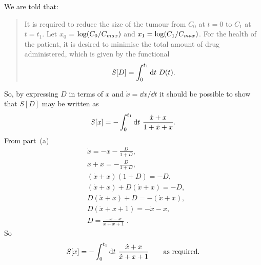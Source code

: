 We are told that:
\begin{quote}
	It is required to reduce the size of the tumour from $C_0$ at $t = 0$ to $C_1$ at
	$t = t_1$. Let $x_0$ = $\log(C_0/C_{max})$ and $x_1 = \log(C_1/C_{max})$. For the health of the
	patient, it is desired to minimise the total amount of drug administered,
	which is given by the functional
	\[
		S[D] = \int_{0}^{t_1}\mathrm{d} t\,\,D(t).
	\]
\end{quote}
So, by expressing $D$ in terms of $x$ and $\dot{x}=\dd x/\dd t$ it should be possible to show that $S[D]$ may be written as
\[
	S[x] = -\int_{0}^{t_1}\mathrm{d} t\,\,\frac{\dot{x} + x}{1 + \dot{x} + x}.
\]
From part~(a)
\begin{align*}
	{}&\dot{x}     = -x - \frac{D}{1+D},\\
	{}&\dot{x} + x = - \frac{D}{1+D},\\
	{}&(\dot{x} + x)(1+D) = -D,\\
	{}& (\dot{x} + x) + D(\dot{x} + x) = -D,\\
	{}& D(\dot{x} + x) + D = -(\dot{x} + x),\\
	{}& D(\dot{x} + x + 1) = -\dot{x} - x,\\
	{}& D = \frac{-\dot{x} - x}{\dot{x} + x + 1}\,\,.
\end{align*}
So
\[
	S[x] = -\int_{0}^{t_1}\mathrm{d} t\,\,\frac{\dot{x} + x}{\dot{x} + x + 1}\qquad\textrm{as required.}
\]

